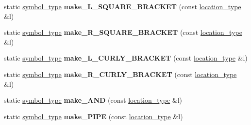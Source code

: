 \begin{DoxyCompactItemize}
\item 
static \hyperlink{classyy_1_1spec__parser_ab8cb3674e6a9b60026cbd40466ea149b}{symbol\+\_\+type} {\bfseries make\+\_\+\+L\+\_\+\+S\+Q\+U\+A\+R\+E\+\_\+\+B\+R\+A\+C\+K\+ET} (const \hyperlink{classyy_1_1spec__parser_aeb5b1e66f65306eca737db5dfa61590d}{location\+\_\+type} \&l)\hypertarget{classyy_1_1spec__parser_a5f71e7b44ec9cd19467c727d764f8df6}{}\label{classyy_1_1spec__parser_a5f71e7b44ec9cd19467c727d764f8df6}

\item 
static \hyperlink{classyy_1_1spec__parser_ab8cb3674e6a9b60026cbd40466ea149b}{symbol\+\_\+type} {\bfseries make\+\_\+\+R\+\_\+\+S\+Q\+U\+A\+R\+E\+\_\+\+B\+R\+A\+C\+K\+ET} (const \hyperlink{classyy_1_1spec__parser_aeb5b1e66f65306eca737db5dfa61590d}{location\+\_\+type} \&l)\hypertarget{classyy_1_1spec__parser_a74b760b048122aa1469512b418ea21a0}{}\label{classyy_1_1spec__parser_a74b760b048122aa1469512b418ea21a0}

\item 
static \hyperlink{classyy_1_1spec__parser_ab8cb3674e6a9b60026cbd40466ea149b}{symbol\+\_\+type} {\bfseries make\+\_\+\+L\+\_\+\+C\+U\+R\+L\+Y\+\_\+\+B\+R\+A\+C\+K\+ET} (const \hyperlink{classyy_1_1spec__parser_aeb5b1e66f65306eca737db5dfa61590d}{location\+\_\+type} \&l)\hypertarget{classyy_1_1spec__parser_a28ee335c1efeb09eff134275556376c6}{}\label{classyy_1_1spec__parser_a28ee335c1efeb09eff134275556376c6}

\item 
static \hyperlink{classyy_1_1spec__parser_ab8cb3674e6a9b60026cbd40466ea149b}{symbol\+\_\+type} {\bfseries make\+\_\+\+R\+\_\+\+C\+U\+R\+L\+Y\+\_\+\+B\+R\+A\+C\+K\+ET} (const \hyperlink{classyy_1_1spec__parser_aeb5b1e66f65306eca737db5dfa61590d}{location\+\_\+type} \&l)\hypertarget{classyy_1_1spec__parser_a38898d72d0b041629afa4c9fc3f3a95a}{}\label{classyy_1_1spec__parser_a38898d72d0b041629afa4c9fc3f3a95a}

\item 
static \hyperlink{classyy_1_1spec__parser_ab8cb3674e6a9b60026cbd40466ea149b}{symbol\+\_\+type} {\bfseries make\+\_\+\+A\+ND} (const \hyperlink{classyy_1_1spec__parser_aeb5b1e66f65306eca737db5dfa61590d}{location\+\_\+type} \&l)\hypertarget{classyy_1_1spec__parser_ad2f491f3bbacddbd9d3fa8f415c59cd4}{}\label{classyy_1_1spec__parser_ad2f491f3bbacddbd9d3fa8f415c59cd4}

\item 
static \hyperlink{classyy_1_1spec__parser_ab8cb3674e6a9b60026cbd40466ea149b}{symbol\+\_\+type} {\bfseries make\+\_\+\+P\+I\+PE} (const \hyperlink{classyy_1_1spec__parser_aeb5b1e66f65306eca737db5dfa61590d}{location\+\_\+type} \&l)\hypertarget{classyy_1_1spec__parser_a9074f79541658c28ce44b96e4ea18e0c}{}\label{classyy_1_1spec__parser_a9074f79541658c28ce44b96e4ea18e0c}


\end{DoxyCompactItemize}
